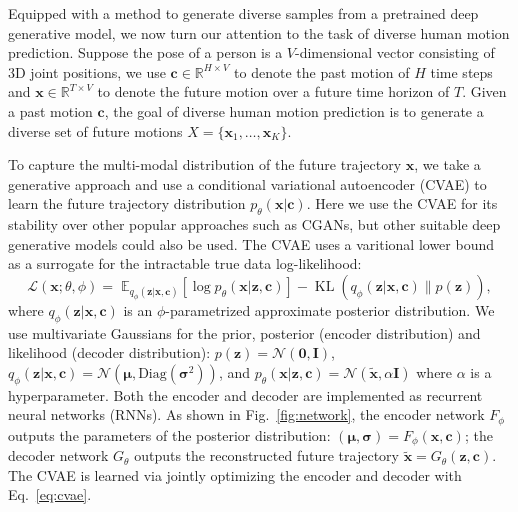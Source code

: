 \documentclass[runningheads]{llncs}
\begin{document}
	Equipped with a method to generate diverse samples from a pretrained deep generative model, we now turn our attention to the task of diverse human motion prediction.
	Suppose the pose of a person is a $V$-dimensional vector consisting of 3D joint positions, we use $\mathbf{c} \in \mathbb{R}^{H \times V}$ to denote the past motion of $H$ time steps and $\mathbf{x} \in \mathbb{R}^{T \times V}$ to denote the future motion over a future time horizon of $T$. Given a past motion $\mathbf{c}$, the goal of diverse human motion prediction is to generate a diverse set of future motions $X = \{\mathbf{x}_1, \ldots, \mathbf{x}_K\}$.
	
	To capture the multi-modal distribution of the future trajectory $\mathbf{x}$, we take a generative approach and use a conditional variational autoencoder (CVAE) to learn the future trajectory distribution $p_\theta(\mathbf{x}|\mathbf{c})$. Here we use the CVAE for its stability over other popular approaches such as CGANs, but other suitable deep generative models could also be used. The CVAE uses a varitional lower bound~\cite{jordan1999introduction} as a surrogate for the intractable true data log-likelihood:
	\begin{equation}
	\label{eq:cvae}
	\mathcal{L}(\mathbf{x} ; \theta, \phi)= \; \mathbb{E}_{q_{\phi}(\mathbf{z} | \mathbf{x}, \mathbf{c})}\left[\log p_{\theta}(\mathbf{x} | \mathbf{z}, \mathbf{c})\right]
	-\operatorname{KL}\left(q_{\phi}(\mathbf{z} | \mathbf{x}, \mathbf{c}) \| p(\mathbf{z})\right),
	\end{equation}
	where $q_{\phi}(\mathbf{z} | \mathbf{x}, \mathbf{c})$ is an $\phi$-parametrized approximate posterior distribution.
	We use multivariate Gaussians for the prior, posterior (encoder distribution) and likelihood (decoder distribution): $p(\mathbf{z})=\mathcal{N}(\mathbf{0}, \mathbf{I})$,  $q_{\phi}(\mathbf{z} | \mathbf{x}, \mathbf{c}) = \mathcal{N}(\boldsymbol{\mu}, \text{Diag}(\boldsymbol{\sigma}^2))$, and $p_\theta(\mathbf{x}|\mathbf{z}, \mathbf{c}) = \mathcal{N}(\tilde{\mathbf{x}}, \alpha\mathbf{I})$ where $\alpha$ is a hyperparameter.
	Both the encoder and decoder are implemented as recurrent neural networks (RNNs). As shown in Fig.~\ref{fig:network}, the encoder network $F_\phi$ outputs the parameters of the posterior distribution: $(\boldsymbol{\mu}, \boldsymbol{\sigma}) = F_\phi(\mathbf{x}, \mathbf{c})$; the decoder network $G_\theta$ outputs the reconstructed future trajectory $\tilde{\mathbf{x}} = G_\theta(\mathbf{z}, \mathbf{c})$. The CVAE is learned via jointly optimizing the encoder and decoder with Eq.~\eqref{eq:cvae}.
	
\end{document}
